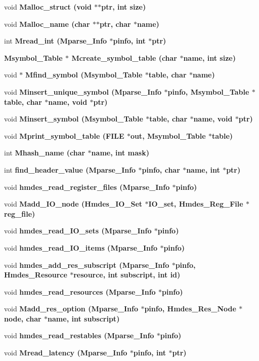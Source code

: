 \begin{CompactItemize}
void \bf{Malloc\_\-struct} (void $\ast$$\ast$ptr, int size)
\item 
void \bf{Malloc\_\-name} (char $\ast$$\ast$ptr, char $\ast$\bf{name})
\item 
int \bf{Mread\_\-int} (\bf{Mparse\_\-Info} $\ast$pinfo, int $\ast$ptr)
\item 
\bf{Msymbol\_\-Table} $\ast$ \bf{Mcreate\_\-symbol\_\-table} (char $\ast$\bf{name}, int size)
\item 
void $\ast$ \bf{Mfind\_\-symbol} (\bf{Msymbol\_\-Table} $\ast$table, char $\ast$\bf{name})
\item 
void \bf{Minsert\_\-unique\_\-symbol} (\bf{Mparse\_\-Info} $\ast$pinfo, \bf{Msymbol\_\-Table} $\ast$table, char $\ast$\bf{name}, void $\ast$ptr)
\item 
void \bf{Minsert\_\-symbol} (\bf{Msymbol\_\-Table} $\ast$table, char $\ast$\bf{name}, void $\ast$ptr)
\item 
void \bf{Mprint\_\-symbol\_\-table} (FILE $\ast$out, \bf{Msymbol\_\-Table} $\ast$table)
\item 
int \bf{Mhash\_\-name} (char $\ast$\bf{name}, int mask)
\item 
int \bf{find\_\-header\_\-value} (\bf{Mparse\_\-Info} $\ast$pinfo, char $\ast$\bf{name}, int $\ast$ptr)
\item 
void \bf{hmdes\_\-read\_\-register\_\-files} (\bf{Mparse\_\-Info} $\ast$pinfo)
\item 
void \bf{Madd\_\-IO\_\-node} (\bf{Hmdes\_\-IO\_\-Set} $\ast$IO\_\-set, \bf{Hmdes\_\-Reg\_\-File} $\ast$reg\_\-file)
\item 
void \bf{hmdes\_\-read\_\-IO\_\-sets} (\bf{Mparse\_\-Info} $\ast$pinfo)
\item 
void \bf{hmdes\_\-read\_\-IO\_\-items} (\bf{Mparse\_\-Info} $\ast$pinfo)
\item 
void \bf{hmdes\_\-add\_\-res\_\-subscript} (\bf{Mparse\_\-Info} $\ast$pinfo, \bf{Hmdes\_\-Resource} $\ast$resource, int subscript, int id)
\item 
void \bf{hmdes\_\-read\_\-resources} (\bf{Mparse\_\-Info} $\ast$pinfo)
\item 
void \bf{Madd\_\-res\_\-option} (\bf{Mparse\_\-Info} $\ast$pinfo, \bf{Hmdes\_\-Res\_\-Node} $\ast$\bf{node}, char $\ast$\bf{name}, int subscript)
\item 
void \bf{hmdes\_\-read\_\-restables} (\bf{Mparse\_\-Info} $\ast$pinfo)
\item 
void \bf{Mread\_\-latency} (\bf{Mparse\_\-Info} $\ast$pinfo, int $\ast$ptr)
\item 

\end{CompactItemize}
